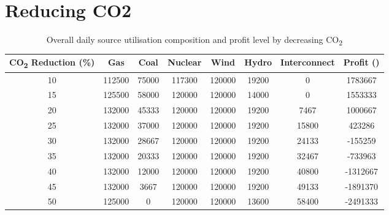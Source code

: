\documentclass[twocolumn]{article}
\begin{document}
    
    
    
    \section{Reducing CO2}\label{sec:app-co2}
    
    
    \begin{table}[h]
    	\centering
    	\centering
        \begin{tabular}{cccccccc}
        	\hline
        	CO\textsubscript{2} Reduction (\%) & Gas & Coal & Nuclear & Wind & Hydro & Interconnect & Profit (\textsterling) \\ \hline
			   10 & 112500 & 75000 & 117300 & 120000 & 19200 & 0 & 1783667 \\
               15 & 125500 & 58000 & 120000 & 120000 & 14000 & 0 & 1553333 \\
               20 & 132000 & 45333 & 120000 & 120000 & 19200 & 7467 & 1000667 \\
               25 & 132000 & 37000 & 120000 & 120000 & 19200 & 15800 & 423286 \\
               30 & 132000 & 28667 & 120000 & 120000 & 19200 & 24133 & -155259 \\
               35 & 132000 & 20333 & 120000 & 120000 & 19200 & 32467 & -733963 \\
               40 & 132000 & 12000 & 120000 & 120000 & 19200 & 40800 & -1312667 \\
               45 & 132000 & 3667 & 120000 & 120000 & 19200 & 49133 & -1891370 \\
               50 & 125000 & 0 & 120000 & 120000 & 13600 & 58400 & -2491333 \\ \hline
        \end{tabular}
        \caption{Overall daily source utilisation composition and profit level by decreasing CO\textsubscript{2}\label{table:co2-rampdown}}
    \end{table}
    
\end{document}
